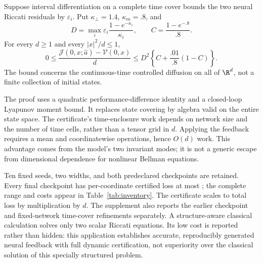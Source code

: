 \begin{theorem}\label{thm:inventory}
Suppose interval differentiation on a complete time cover bounds the two neural Riccati residuals by $\varepsilon_i$. Put $\kappa_\perp=1.4$, $\kappa_m=.8$, and
\[
 D=\max_i\varepsilon_i\frac{1-e^{-\kappa_i}}{\kappa_i},\qquad
 C=\frac{1-e^{-.8}}{.8}.
\]
For every $d\geq1$ and every $|x|^2/d\leq1$,
\begin{equation}
 0\leq\frac{\mathcal J(0,x;\widehat a)-\mathcal V(0,x)}d
 \leq D^2\left\{C+\frac{.01}{.8}(1-C)\right\}.
 \label{eq:inventorycertificate}
\end{equation}
The bound concerns the continuous-time controlled diffusion on all of $\R^d$, not a finite collection of initial states.
\end{theorem}
The proof uses a quadratic performance-difference identity and a closed-loop Lyapunov moment bound. It replaces state covering by algebra valid on the entire state space. The certificate's time-enclosure work depends on network size and the number of time cells, rather than a tensor grid in $d$. Applying the feedback requires a mean and coordinatewise operations, hence $O(d)$ work. This advantage comes from the model's two invariant modes; it is not a generic escape from dimensional dependence for nonlinear Bellman equations.

Ten fixed seeds, two widths, and both predeclared checkpoints are retained. Every final checkpoint has per-coordinate certified loss at most \RInventoryFinalMax; the complete range and costs appear in Table~\ref{tab:inventory}. The certificate scales to total loss by multiplication by $d$. The supplement also reports the earlier checkpoint and fixed-network time-cover refinements separately. A structure-aware classical calculation solves only two scalar Riccati equations. Its low cost is reported rather than hidden: this application establishes accurate, reproducibly generated neural feedback with full dynamic certification, not superiority over the classical solution of this specially structured problem.

